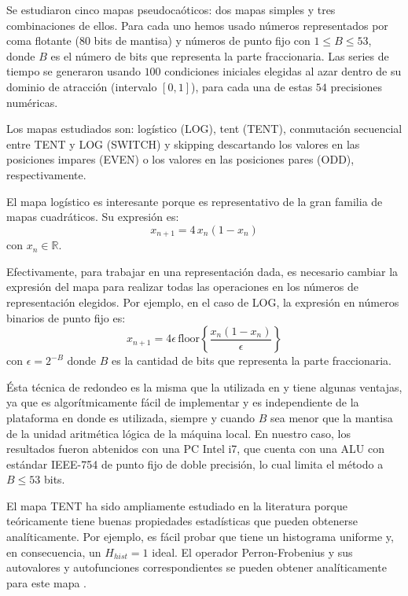 Se estudiaron cinco mapas pseudocaóticos: dos mapas simples y tres combinaciones de ellos.
Para cada uno hemos usado números representados por coma flotante (80 bits de mantisa) y números de punto fijo con $1\leq B \leq 53$, donde $B$ es el número de bits que representa la parte fraccionaria.
Las series de tiempo se generaron usando $100$ condiciones iniciales elegidas al azar dentro de su dominio de atracción (intervalo $[0,1]$), para cada una de estas $54$ precisiones numéricas.

Los mapas estudiados son: logístico (LOG), tent (TENT), conmutación secuencial entre TENT y LOG (SWITCH) y skipping descartando los valores en las posiciones impares (EVEN) o los valores en las posiciones pares (ODD), respectivamente.

El mapa logístico es interesante porque es representativo de la gran familia de mapas cuadráticos.
Su expresión es:
%
\begin{equation}\label{eq:logimap}
x_{n+1}=4\,x_{n}(1-x_{n}) 
\end{equation}
%
con $x_n \in \mathbb{R}$.

Efectivamente, para trabajar en una representación dada, es necesario cambiar la expresión del mapa para realizar todas las operaciones en los números de representación elegidos.
Por ejemplo, en el caso de LOG, la expresión en números binarios de punto fijo es:
%
\begin{equation}\label{eq:logimapB2}
x_{n+1}=4 \epsilon \,\text{floor}\left\{\frac{x_n(1-x_n)}{\epsilon}\right\}
\end{equation}
%
con $\epsilon = 2^{-B}$ donde $B$ es la cantidad de bits que representa la parte fraccionaria.

Ésta técnica de redondeo es la misma que la utilizada en \cite{Antonelli2012, Grebogi1988, Nagaraj2008} y tiene algunas ventajas, ya que es algorítmicamente fácil de implementar y es independiente de la plataforma en donde es utilizada, siempre y cuando $B$ sea menor que la mantisa de la unidad aritmética lógica de la máquina local.
En nuestro caso, los resultados fueron abtenidos con una PC Intel i7, que cuenta con una ALU con estándar IEEE-754 de punto fijo de doble precisión, lo cual limita el método a $B \leq 53$ bits.

El mapa TENT ha sido ampliamente estudiado en la literatura porque teóricamente tiene buenas propiedades estadísticas que pueden obtenerse analíticamente.
Por ejemplo, es fácil probar que tiene un histograma uniforme y, en consecuencia, un $H_{hist} = 1$ ideal.
El operador Perron-Frobenius y sus autovalores y autofunciones correspondientes se pueden obtener analíticamente para este mapa \cite{Lasota1994}.

